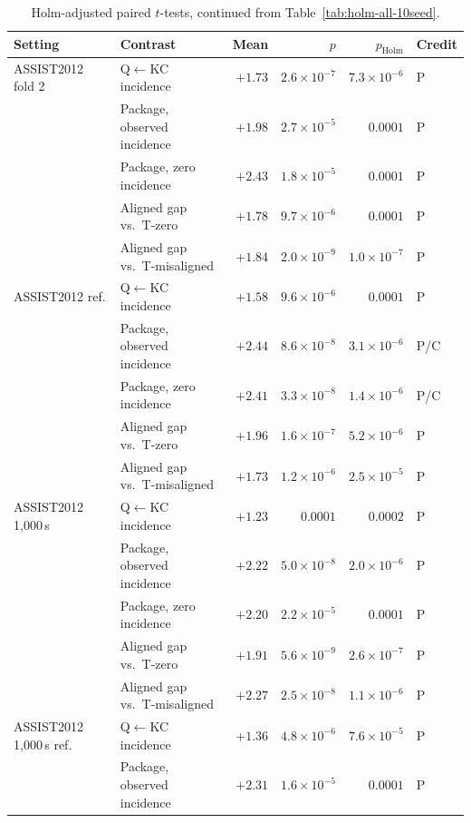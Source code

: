 \begin{table}[tbp]
\caption{Holm-adjusted paired $t$-tests, continued from Table~\ref{tab:holm-all-10seed}.}
\label{tab:holm-all-10seed-b}
\centering
\scriptsize
\setlength{\tabcolsep}{3pt}
\renewcommand{\arraystretch}{0.84}
\begin{tabular}{@{}llrrrl@{}}
\toprule
Setting & Contrast & Mean & $p$ & $p_{\mathrm{Holm}}$ & Credit \\
\midrule
ASSIST2012 fold 2 & Q$\leftarrow$KC incidence & $+1.73$ & $2.6\times10^{-7}$ & $7.3\times10^{-6}$ & P \\
 & Package, observed incidence & $+1.98$ & $2.7\times10^{-5}$ & $0.0001$ & P \\
 & Package, zero incidence & $+2.43$ & $1.8\times10^{-5}$ & $0.0001$ & P \\
 & Aligned gap vs.\ T-zero & $+1.78$ & $9.7\times10^{-6}$ & $0.0001$ & P \\
 & Aligned gap vs.\ T-misaligned & $+1.84$ & $2.0\times10^{-9}$ & $1.0\times10^{-7}$ & P \\
\addlinespace
ASSIST2012 ref. & Q$\leftarrow$KC incidence & $+1.58$ & $9.6\times10^{-6}$ & $0.0001$ & P \\
 & Package, observed incidence & $+2.44$ & $8.6\times10^{-8}$ & $3.1\times10^{-6}$ & P/C \\
 & Package, zero incidence & $+2.41$ & $3.3\times10^{-8}$ & $1.4\times10^{-6}$ & P/C \\
 & Aligned gap vs.\ T-zero & $+1.96$ & $1.6\times10^{-7}$ & $5.2\times10^{-6}$ & P \\
 & Aligned gap vs.\ T-misaligned & $+1.73$ & $1.2\times10^{-6}$ & $2.5\times10^{-5}$ & P \\
\addlinespace
ASSIST2012 1{,}000\,s & Q$\leftarrow$KC incidence & $+1.23$ & $0.0001$ & $0.0002$ & P \\
 & Package, observed incidence & $+2.22$ & $5.0\times10^{-8}$ & $2.0\times10^{-6}$ & P \\
 & Package, zero incidence & $+2.20$ & $2.2\times10^{-5}$ & $0.0001$ & P \\
 & Aligned gap vs.\ T-zero & $+1.91$ & $5.6\times10^{-9}$ & $2.6\times10^{-7}$ & P \\
 & Aligned gap vs.\ T-misaligned & $+2.27$ & $2.5\times10^{-8}$ & $1.1\times10^{-6}$ & P \\
\addlinespace
ASSIST2012 1{,}000\,s ref. & Q$\leftarrow$KC incidence & $+1.36$ & $4.8\times10^{-6}$ & $7.6\times10^{-5}$ & P \\
 & Package, observed incidence & $+2.31$ & $1.6\times10^{-5}$ & $0.0001$ & P \\

\end{tabular}
\end{table}
